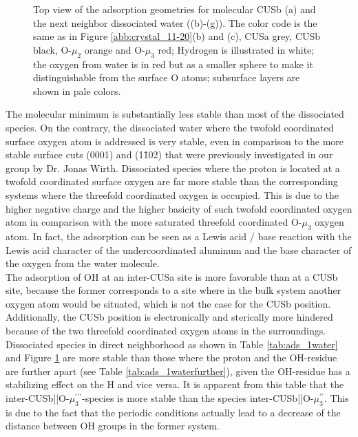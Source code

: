 \documentclass[11pt,DIV=13,BCOR=5mm,a4paper,headinclude]{scrbook}
\begin{document}
\begin{figure}[!ht]
 \caption{Top view of the adsorption geometries for molecular CUSb (a) and the next neighbor dissociated water 
((b)-(g)).
The color code is the same as in Figure \ref{abb:crystal_11-20}(b) and (c), CUSa grey, CUSb black, O-$\mu_2$ orange and O-$\mu_3$ red; Hydrogen is illustrated in white; the oxygen from water is in red but as a smaller sphere to make it distinguishable from the surface O atoms; subsurface layers are shown in pale colors.}
        \label{abb:ads-geoms}
 \end{figure}

The molecular minimum is substantially less stable than most of the dissociated species.
On the contrary, the dissociated water where the twofold coordinated surface oxygen atom is addressed is very stable, even in comparison to the more stable surface cuts (0001) and (1\=102) that were previously investigated in our group by Dr. Jonas Wirth\cite{Wirth2016,WirthJPCC2012}.
Dissociated species where the proton is located at a twofold coordinated surface oxygen are far more stable than the corresponding systems where the threefold coordinated oxygen is occupied.
This is due to the higher negative charge and the higher basicity of such twofold coordinated oxygen atom in comparison with the more saturated threefold coordinated O-$\mu_3$ oxygen atom.
In fact, the adsorption can be seen as a Lewis acid / base reaction\cite{Stair1981} with the Lewis acid character of the undercoordinated aluminum and the base character of the oxygen from the water molecule.
\\
The adsorption of OH at an inter-CUSa site is more favorable than at a CUSb site, because the former corresponds to a site where in the bulk system another oxygen atom would be situated, which is not the case for the CUSb position.
Additionally, the CUSb position is electronically and sterically more hindered because of the two threefold coordinated oxygen atoms in the surroundings.
\\
Dissociated species in direct neighborhood as shown in Table \ref{tab:ads_1water} and Figure \ref{abb:ads-geoms} are more stable than those where the proton and the OH-residue are further apart (see Table \ref{tab:ads_1waterfurther}), given the OH-residue has a stabilizing effect on the H and vice versa.
It is apparent from this table that the inter-CUSb||O-$\mu_3^{\prime\prime\prime}$-species is more stable than the species inter-CUSb||O-$\mu_3^{\prime\prime}$.
This is due to the fact that the periodic conditions actually lead to a decrease of the distance between OH groups in the former system.
\end{document}
